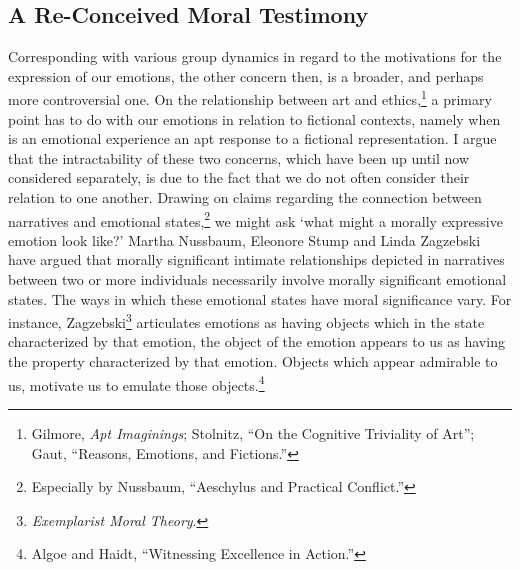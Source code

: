 \documentclass[phdthesis,12pt,final,a4paper]{wuthesis}
\theoremstyle{definition}
\theoremstyle{definition}
\theoremstyle{definition}
\theoremstyle{definition}
\theoremstyle{remark}
\begin{document}
\subsection*{A Re-Conceived Moral Testimony}\label{a-re-conceived-moral-testimony}

Corresponding with various group dynamics in regard to the motivations for the expression of our emotions, the other concern then, is a broader, and perhaps more controversial one. On the relationship between art and ethics,\footnote{Gilmore, \emph{Apt {Imaginings}}; Stolnitz, {``On the {Cognitive Triviality} of {Art}''}; Gaut, {``Reasons, Emotions, and Fictions.''}} a primary point has to do with our emotions in relation to fictional contexts, namely when is an emotional experience an apt response to a fictional representation. I argue that the intractability of these two concerns, which have been up until now considered separately, is due to the fact that we do not often consider their relation to one another. Drawing on claims regarding the connection between narratives and emotional states,\footnote{Especially by Nussbaum, {``Aeschylus and Practical Conflict.''}} we might ask `what might a morally expressive emotion look like?' Martha Nussbaum, Eleonore Stump and Linda Zagzebski have argued that morally significant intimate relationships depicted in narratives between two or more individuals necessarily involve morally significant emotional states. The ways in which these emotional states have moral significance vary. For instance, Zagzebski\footnote{\emph{Exemplarist {Moral Theory}}.} articulates emotions as having objects which in the state characterized by that emotion, the object of the emotion appears to us as having the property characterized by that emotion. Objects which appear admirable to us, motivate us to emulate those objects.\footnote{Algoe and Haidt, {``Witnessing Excellence in Action.''}}
\end{document}
